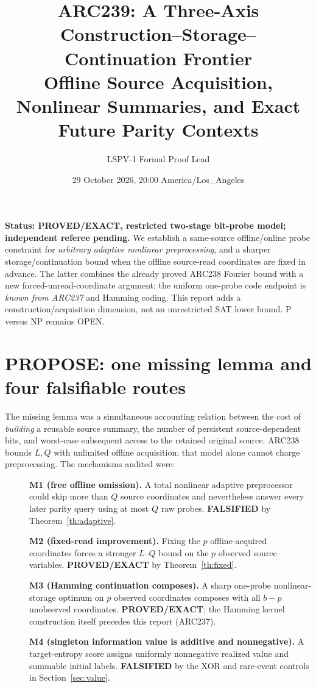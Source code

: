 \documentclass[10pt]{article}
\title{ARC239: A Three-Axis Construction--Storage--Continuation Frontier\\
\large Offline Source Acquisition, Nonlinear Summaries, and Exact Future Parity Contexts}
\author{LSPV-1 Formal Proof Lead}
\date{29 October 2026, 20:00 America/Los\_Angeles}
\begin{document}
\maketitle
\noindent\textbf{Status: PROVED/EXACT, restricted two-stage bit-probe model; independent referee pending.} We establish a same-source offline/online probe constraint for \emph{arbitrary adaptive nonlinear preprocessing}, and a sharper storage/continuation bound when the offline source-read coordinates are fixed in advance. The latter combines the already proved ARC238 Fourier bound with a new forced-unread-coordinate argument; the uniform one-probe code endpoint is \emph{known from ARC237} and Hamming coding. This report adds a construction/acquisition dimension, not an unrestricted SAT lower bound. P versus NP remains OPEN.

\section{PROPOSE: one missing lemma and four falsifiable routes}
The missing lemma was a simultaneous accounting relation between the cost of \emph{building} a reusable source summary, the number of persistent source-dependent bits, and worst-case subsequent access to the retained original source. ARC238 bounds $L,Q$ with unlimited offline acquisition; that model alone cannot charge preprocessing. The mechanisms audited were:
\begin{description}
\item[] \textbf{M1 (free offline omission).} A total nonlinear adaptive preprocessor could skip more than $Q$ source coordinates and nevertheless answer every later parity query using at most $Q$ raw probes. \textbf{FALSIFIED} by Theorem~\ref{th:adaptive}.
\item[] \textbf{M2 (fixed-read improvement).} Fixing the $p$ offline-acquired coordinates forces a stronger $L$--$Q$ bound on the $p$ observed source variables. \textbf{PROVED/EXACT} by Theorem~\ref{th:fixed}.
\item[] \textbf{M3 (Hamming continuation composes).} A sharp one-probe nonlinear-storage optimum on $p$ observed coordinates composes with all $b-p$ unobserved coordinates. \textbf{PROVED/EXACT}; the Hamming kernel construction itself precedes this report (ARC237).
\item[] \textbf{M4 (singleton information value is additive and nonnegative).} A target-entropy score assigns uniformly nonnegative realized value and summable initial labels. \textbf{FALSIFIED} by the XOR and rare-event controls in Section~\ref{sec:value}.
\end{description}
\end{document}
